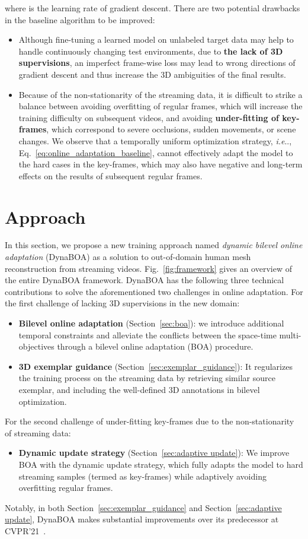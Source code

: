\documentclass[10pt,journal,compsoc]{IEEEtran}
\makeatletter
\DeclareRobustCommand\onedot{\futurelet\@let@token\@onedot}
\def\@onedot{\ifx\@let@token.\else.\null\fi\xspace}
\def\ie{\emph{i.e}\onedot} \def\Ie{\emph{I.e}\onedot}
\newcommand{\eqn}[1]{Eq.~\eqref{#1}}
\newcommand{\sect}[1]{Section~\ref{#1}}
\newcommand{\fig}[1]{Fig.~\ref{#1}}
\makeatother
\begin{document}
where  is the learning rate of gradient descent. There are two potential drawbacks in the baseline algorithm to be improved:
\begin{itemize}[leftmargin=10pt]
    \item Although fine-tuning a learned model on unlabeled target data may help to handle continuously changing test environments, due to \textbf{the lack of 3D supervisions}, an imperfect frame-wise loss may lead to wrong directions of gradient descent and thus increase the 3D ambiguities of the final results.
\item Because of the non-stationarity of the streaming data, it is difficult to strike a balance between avoiding overfitting of regular frames, which will increase the training difficulty on subsequent videos, and avoiding \textbf{under-fitting of key-frames}, which correspond to severe occlusions, sudden movements, or scene changes. We observe that a temporally uniform optimization strategy, \ie, \eqn{eq:online_adaptation_baseline}, cannot effectively adapt the model to the hard cases in the key-frames, which may also have negative and long-term effects on the results of subsequent regular frames. 
\end{itemize} \section{Approach}

In this section, we propose a new training approach named \textit{dynamic bilevel online adaptation} (DynaBOA) as a solution to out-of-domain human mesh reconstruction from streaming videos. \fig{fig:framework} gives an overview of the entire DynaBOA framework.
DynaBOA has the following three technical contributions to solve the aforementioned two challenges in online adaptation. For the first challenge of lacking 3D supervisions in the new domain:
\begin{itemize}[leftmargin=10pt]
    \item \textbf{Bilevel online adaptation} (\sect{sec:boa}): we introduce additional temporal constraints and alleviate the conflicts between the space-time multi-objectives through a bilevel online adaptation (BOA) procedure. 
    \item \textbf{3D exemplar guidance} (\sect{sec:exemplar_guidance}): It regularizes the training process on the streaming data by retrieving similar source exemplar, and including the well-defined 3D annotations in bilevel optimization. 
\end{itemize}
For the second challenge of under-fitting key-frames due to the non-stationarity of streaming data:
\begin{itemize}[leftmargin=10pt]
    \item \textbf{Dynamic update strategy} (\sect{sec:adaptive update}): We improve BOA with the dynamic update strategy, which fully adapts the model to hard streaming samples (termed as key-frames) while adaptively avoiding overfitting regular frames.
\end{itemize}
Notably, in both \sect{sec:exemplar_guidance} and \sect{sec:adaptive update}, DynaBOA makes substantial improvements over its predecessor at CVPR'21~\cite{guan2021bilevel}.
\end{document}

